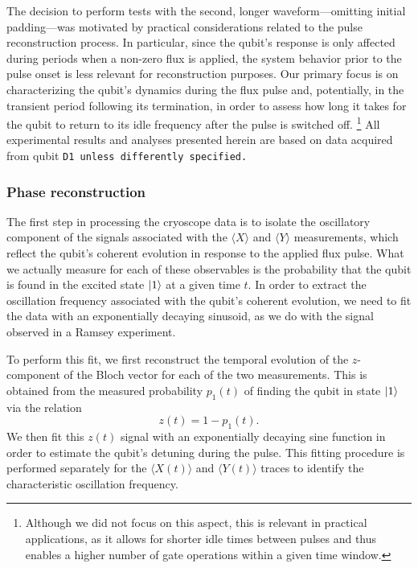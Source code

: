 The decision to perform tests with the second, longer waveform—omitting initial padding—was motivated by practical considerations related to the pulse reconstruction process. 
In particular, since the qubit's response is only affected during periods when a non-zero flux is applied, the system behavior prior to the pulse onset is less relevant for reconstruction purposes.
Our primary focus is on characterizing the qubit's dynamics during the flux pulse and, potentially, in the transient period following its termination, in order to assess how long it takes for the qubit to return to its idle frequency after the pulse is switched off.
\footnote{Although we did not focus on this aspect, this is relevant in practical applications, as it allows for shorter idle times between pulses and thus enables a higher number of gate operations within a given time window.}
All experimental results and analyses presented herein are based on data acquired from qubit \tt{D1} unless differently specified.

\subsubsection{Phase reconstruction}
The first step in processing the cryoscope data is to isolate the oscillatory component of the signals associated with the $\langle X \rangle$ and $\langle Y \rangle$ measurements, which reflect the qubit's coherent evolution in response to the applied flux pulse.
What we actually measure for each of these observables is the probability that the qubit is found in the excited state $\ket{1}$ at a given time $t$. 
In order to extract the oscillation frequency associated with the qubit's coherent evolution, we need to fit the data with an exponentially decaying sinusoid, as we do with the signal observed in a Ramsey experiment.

To perform this fit, we first reconstruct the temporal evolution of the $z$-component of the Bloch vector for each of the two measurements. 
This is obtained from the measured probability $p_1(t)$ of finding the qubit in state $\ket{1}$ via the relation
\begin{equation}
    z(t) = 1 - p_1(t).
\end{equation}
We then fit this $z(t)$ signal with an exponentially decaying sine function in order to estimate the qubit's detuning during the pulse. 
This fitting procedure is performed separately for the $\langle X(t) \rangle$ and $\langle Y(t) \rangle$ traces to identify the characteristic oscillation frequency.

